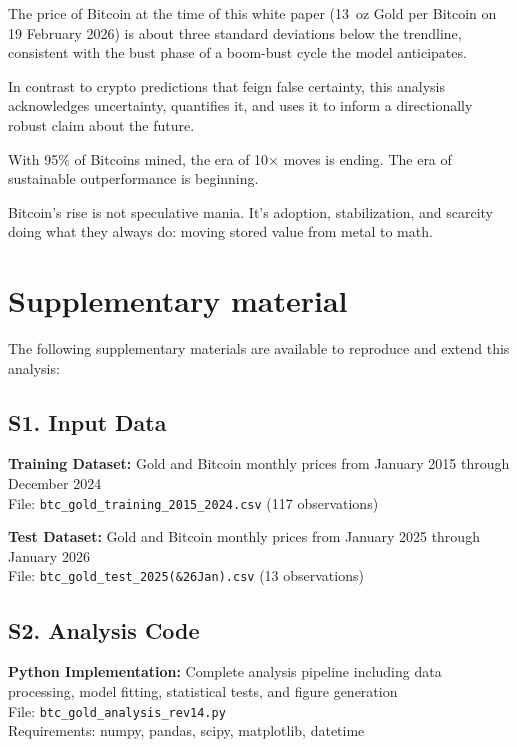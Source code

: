 \documentclass[11pt,letterpaper]{article}
\begin{document}
The price of Bitcoin at the time of this white paper (13~oz Gold per Bitcoin on 19 February 2026) is about three standard deviations below the trendline, consistent with the bust phase of a boom-bust cycle the model anticipates.

In contrast to crypto predictions that feign false certainty, this analysis acknowledges uncertainty, quantifies it, and uses it to inform a directionally robust claim about the future.

With 95\% of Bitcoins mined, the era of 10$\times$ moves is ending. The era of sustainable outperformance is beginning.

Bitcoin's rise is not speculative mania. It's adoption, stabilization, and scarcity doing what they always do: moving stored value from metal to math.

\section{Supplementary material}

The following supplementary materials are available to reproduce and extend this analysis:

\subsection{S1. Input Data}

\textbf{Training Dataset:} Gold and Bitcoin monthly prices from January 2015 through December 2024\\
File: \texttt{btc\_gold\_training\_2015\_2024.csv} (117 observations)

\textbf{Test Dataset:} Gold and Bitcoin monthly prices from January 2025 through January 2026\\
File: \texttt{btc\_gold\_test\_2025(\&26Jan).csv} (13 observations)

\subsection{S2. Analysis Code}

\textbf{Python Implementation:} Complete analysis pipeline including data processing, model fitting, statistical tests, and figure generation\\
File: \texttt{btc\_gold\_analysis\_rev14.py}\\
Requirements: numpy, pandas, scipy, matplotlib, datetime
\end{document}
